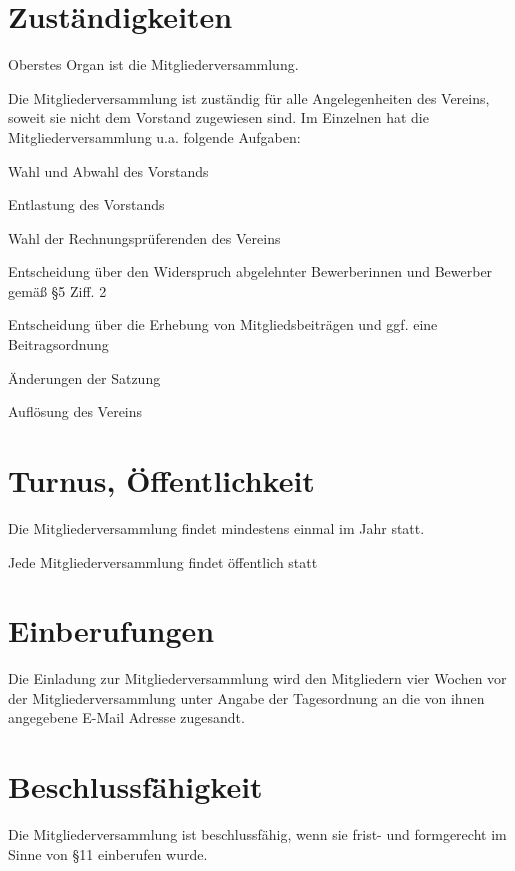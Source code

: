 \section{Zuständigkeiten}
	\begin{myEnum}
		\item Oberstes Organ ist die Mitgliederversammlung.
		\item Die Mitgliederversammlung ist zuständig für alle Angelegenheiten des Vereins, soweit sie nicht dem Vorstand zugewiesen sind. Im Einzelnen hat die Mitgliederversammlung u.a. folgende Aufgaben:
			\begin{mySubEnum}
				\item Wahl und Abwahl des Vorstands
				\item Entlastung des Vorstands
				\item Wahl der Rechnungsprüferenden des Vereins
				\item Entscheidung über den Widerspruch abgelehnter Bewerberinnen und Bewerber gemäß §5 Ziff. 2
				\item Entscheidung über die Erhebung von Mitgliedsbeiträgen und ggf. eine Beitragsordnung
				\item Änderungen der Satzung
				\item Auflösung des Vereins
			\end{mySubEnum}
	\end{myEnum}

\section{Turnus, Öffentlichkeit}
	\begin{myEnum}
		\item Die Mitgliederversammlung findet mindestens einmal im Jahr statt. 
		\item Jede Mitgliederversammlung findet öffentlich statt
	\end{myEnum}

\section{Einberufungen}
	Die Einladung zur Mitgliederversammlung wird den Mitgliedern vier Wochen vor der Mitgliederversammlung unter Angabe der Tagesordnung an die von ihnen angegebene E-Mail Adresse zugesandt.

\section{Beschlussfähigkeit}
	Die Mitgliederversammlung ist beschlussfähig, wenn sie frist- und formgerecht im Sinne von §11 einberufen wurde.
	
